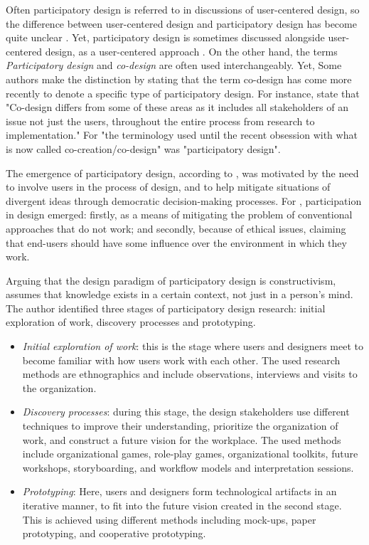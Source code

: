 \documentclass[manuscript,screen,nonacm,12pt]{acmart}
\begin{document}
Often participatory design is referred to in discussions of user-centered design, so the difference between user-centered design and participatory design has become quite unclear \cite{bannon2018introduction}. Yet, participatory design is sometimes discussed alongside user-centered design, as a user-centered approach \cite{leng2018designing}.
On the other hand, the terms \textit{Participatory design} and \textit{co-design} are often used  interchangeably. Yet, Some authors make the distinction by stating that the term co-design has come more recently to denote a specific type of participatory design. For instance, \citet{szebeko2010co} state that "Co-design differs from some of these areas as it includes all stakeholders of an issue not just the users, throughout the entire process from research to implementation." For \citet{Sanders2008} "the terminology used until the recent obsession with what is now called co-creation/co-design" was "participatory design".

The emergence of participatory design, according to \citet{bannon2018introduction}, was motivated by the need to involve users in the process of design, and to help mitigate situations of divergent ideas through democratic decision-making processes. 
For \citet{dearnley1983favour}, participation in design emerged: firstly, as a means of mitigating the problem of conventional approaches that do not work; and secondly, because of ethical issues, claiming that end-users should have some influence over the environment in which they work.

Arguing that the design paradigm of participatory design is constructivism,\citet{spinuzzi2005methodology} assumes that knowledge exists in a certain context, not just in a person's mind. The author identified three stages of participatory design research: initial exploration of work, discovery processes and prototyping. 
\begin{itemize}
    \item \textit{Initial exploration of work}: this is the stage where users and designers meet to become familiar with how users work with each other. The used research methods are ethnographics and include observations, interviews and visits to the organization.
    \item \textit{Discovery processes}: during this stage, the design stakeholders use different techniques to improve their understanding, prioritize the organization of work, and construct a future vision for the workplace. The used methods include organizational games, role-play games, organizational toolkits, future workshops, storyboarding, and workflow models and interpretation sessions.
    \item \textit{Prototyping}: Here, users and designers form technological artifacts in an iterative manner, to fit into the future vision created in the second stage. This is achieved using different methods including mock-ups, paper prototyping, and cooperative prototyping.
\end{itemize}
\end{document}
